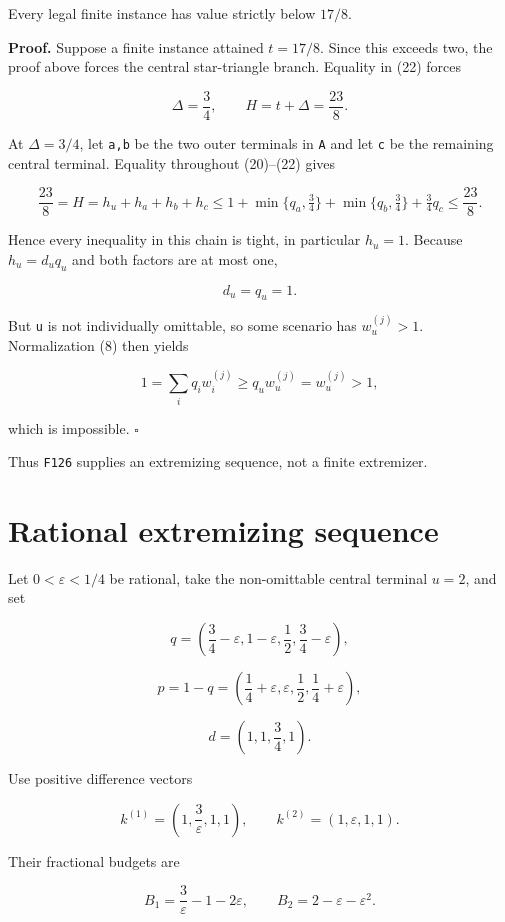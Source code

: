 \documentclass[
  11pt,
]{article}
\begin{document}
Every legal finite instance has value strictly below \(17/8\).

\textbf{Proof.} Suppose a finite instance attained \(t=17/8\). Since
this exceeds two, the proof above forces the central star-triangle
branch. Equality in (22) forces

\[
\Delta=\frac34,
\qquad
H=t+\Delta=\frac{23}{8}.
\]

At \(\Delta=3/4\), let \texttt{a,b} be the two outer terminals in
\texttt{A} and let \texttt{c} be the remaining central terminal.
Equality throughout (20)--(22) gives

\[
\frac{23}{8}=H
=h_u+h_a+h_b+h_c
\le
1+\min\{q_a,\tfrac34\}
 +\min\{q_b,\tfrac34\}
 +\tfrac34 q_c
\le
\frac{23}{8}.
\]

Hence every inequality in this chain is tight, in particular \(h_u=1\).
Because \(h_u=d_uq_u\) and both factors are at most one,

\[
d_u=q_u=1.
\]

But \texttt{u} is not individually omittable, so some scenario has
\(w_u^{(j)}>1\). Normalization (8) then yields

\[
1=\sum_iq_iw_i^{(j)}
\ge q_uw_u^{(j)}
=w_u^{(j)}>1,
\]

which is impossible. \(\square\)

Thus \texttt{F126} supplies an extremizing sequence, not a finite
extremizer.

\section{Rational extremizing
sequence}\label{rational-extremizing-sequence}

Let \(0<\varepsilon<1/4\) be rational, take the non-omittable central
terminal \(u=2\), and set

\[
q=\left(
\frac34-\varepsilon,
1-\varepsilon,
\frac12,
\frac34-\varepsilon
\right),
\]

\[
p=1-q=\left(
\frac14+\varepsilon,
\varepsilon,
\frac12,
\frac14+\varepsilon
\right),
\]

\[
d=\left(1,1,\frac34,1\right).
\tag{25}
\]

Use positive difference vectors

\[
k^{(1)}=\left(1,\frac3\varepsilon,1,1\right),
\qquad
k^{(2)}=(1,\varepsilon,1,1).
\tag{26}
\]

Their fractional budgets are

\[
B_1=\frac3\varepsilon-1-2\varepsilon,
\qquad
B_2=2-\varepsilon-\varepsilon^2.
\]
\end{document}
